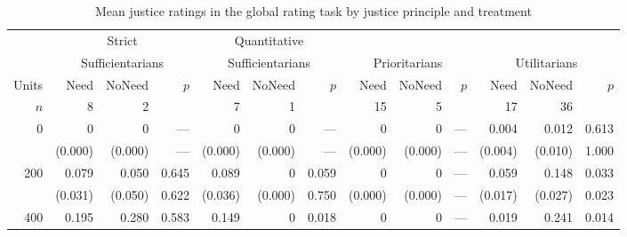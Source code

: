 \documentclass[12pt]{scrartcl}
\begin{document}
\clearpage
\begin{landscape}
   \begin{table}[h!t!]
      \centering
      \caption{Mean justice ratings in the global rating task by justice principle and treatment}\label{tab:global_ratings_principle}
      {\footnotesize
         \begin{tabular}{rrrrrrrrrrrrr}\hline
                          & \multicolumn{3}{c}{Strict}             & \multicolumn{3}{c}{Quantitative}                                                                                                    \\
                          & \multicolumn{3}{c}{Sufficientarians}   & \multicolumn{3}{c}{Sufficientarians}   & \multicolumn{3}{c}{Prioritarians } & \multicolumn{3}{c}{Utilitarians }                     \\\cline{2-13}
            Units         & Need            & NoNeed    & $p$      & Need            & NoNeed    & $p$      & Need            & NoNeed           & $p$     & Need            & NoNeed          & $p$     \\\hline\hline
            $n$           &  8              &  2        &          &  7              &  1        &          & 15              &  5               &         & 17              & 36              &         \\\hline
               0          &  0              &  0        & ---      &  0              &  0        & ---      &  0              &  0               & ---     &  0.004          &  0.012          & 0.613   \\
                          & (0.000)         & (0.000)   & ---      & (0.000)         & (0.000)   & ---      & (0.000)         & (0.000)          & ---     & (0.004)         & (0.010)         & 1.000   \\
             200          &  0.079          &  0.050    & 0.645    &  0.089          &  0        & 0.059    &  0              &  0               & ---     &  0.059          &  0.148          & 0.033   \\
                          & (0.031)         & (0.050)   & 0.622    & (0.036)         & (0.000)   & 0.750    & (0.000)         & (0.000)          & ---     & (0.017)         & (0.027)         & 0.023   \\
             400          &  0.195          &  0.280    & 0.583    &  0.149          &  0        & 0.018    &  0              &  0               & ---     &  0.019          &  0.241          & 0.014   \\

\end{tabular}}
\end{table}
\end{landscape}
\end{document}
